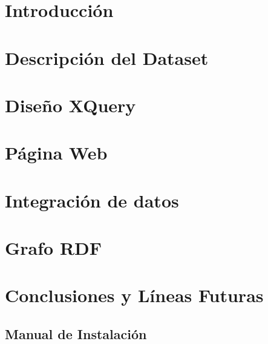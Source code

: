 \documentclass[12pt, a4paper, openany]{article}
\begin{document}


\clearpage
\setcounter{page}{1}



\newpage



\tableofcontents

\section{Introducción}


\section{Descripción del Dataset}


\section{Diseño XQuery}


\section{Página Web}


\section{Integración de datos}


\section{Grafo RDF}



\section{Conclusiones y Líneas Futuras}


\printbibliography

\newpage

\begin{umaappendices}
  \section{Manual de Instalación}

\end{umaappendices}


\end{document}

